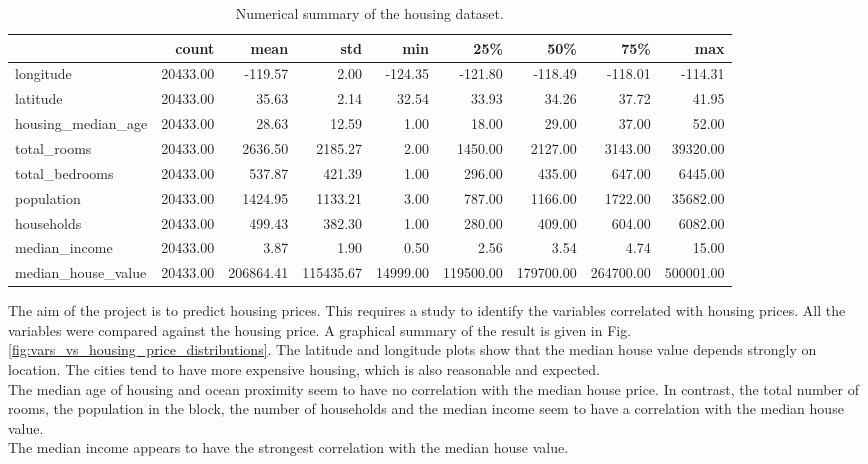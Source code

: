 \begin{table}[H]
\tiny
\begin{tabular}{lrrrrrrrr}
\toprule
 & count & mean & std & min & 25\% & 50\% & 75\% & max \\
\midrule
longitude & 20433.00 & -119.57 & 2.00 & -124.35 & -121.80 & -118.49 & -118.01 & -114.31 \\
latitude & 20433.00 & 35.63 & 2.14 & 32.54 & 33.93 & 34.26 & 37.72 & 41.95 \\
housing\_median\_age & 20433.00 & 28.63 & 12.59 & 1.00 & 18.00 & 29.00 & 37.00 & 52.00 \\
total\_rooms & 20433.00 & 2636.50 & 2185.27 & 2.00 & 1450.00 & 2127.00 & 3143.00 & 39320.00 \\
total\_bedrooms & 20433.00 & 537.87 & 421.39 & 1.00 & 296.00 & 435.00 & 647.00 & 6445.00 \\
population & 20433.00 & 1424.95 & 1133.21 & 3.00 & 787.00 & 1166.00 & 1722.00 & 35682.00 \\
households & 20433.00 & 499.43 & 382.30 & 1.00 & 280.00 & 409.00 & 604.00 & 6082.00 \\
median\_income & 20433.00 & 3.87 & 1.90 & 0.50 & 2.56 & 3.54 & 4.74 & 15.00 \\
median\_house\_value & 20433.00 & 206864.41 & 115435.67 & 14999.00 & 119500.00 & 179700.00 & 264700.00 & 500001.00 \\
\bottomrule
\end{tabular}
\caption{Numerical summary of the housing dataset.}
\label{tab:housing_data_summary}
\end{table}


The aim of the project is to predict housing prices. This requires a study to identify the variables correlated with housing prices. All the variables were compared against the housing price. A graphical summary of the result is given in Fig. \ref{fig:vars_vs_housing_price_distributions}. The latitude and longitude plots show that the median house value depends strongly on location. The cities tend to have more expensive housing, which is also reasonable and expected.\\

The median age of housing and ocean proximity seem to have no correlation with the median house price. In contrast, the total number of rooms, the population in the block, the number of households and the median income seem to have a correlation with the median house value.\\

The median income appears to have the strongest correlation with the median house value.

